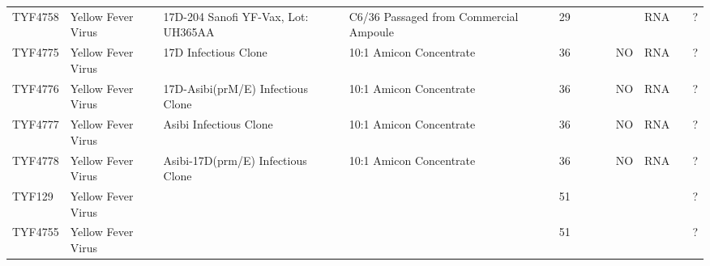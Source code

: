\begin{longtable}{@{}lllllllllllll@{}}
TYF4758        & Yellow Fever Virus & 17D-204 Sanofi YF-Vax, Lot: UH365AA       & C6/36 Passaged from Commercial Ampoule &             & 29                      &                       &           &          &                             & RNA                &                                                                                                  & ?                          \\
TYF4775        & Yellow Fever Virus & 17D Infectious Clone                      & 10:1 Amicon Concentrate                &             & 36                      &                       &           &          & NO                          & RNA                &                                                                                                  & ?                          \\
TYF4776        & Yellow Fever Virus & 17D-Asibi(prM/E) Infectious Clone         & 10:1 Amicon Concentrate                &             & 36                      &                       &           &          & NO                          & RNA                &                                                                                                  & ?                          \\
TYF4777        & Yellow Fever Virus & Asibi Infectious Clone                    & 10:1 Amicon Concentrate                &             & 36                      &                       &           &          & NO                          & RNA                &                                                                                                  & ?                          \\
TYF4778        & Yellow Fever Virus & Asibi-17D(prm/E) Infectious Clone         & 10:1 Amicon Concentrate                &             & 36                      &                       &           &          & NO                          & RNA                &                                                                                                  & ?                          \\
TYF129         & Yellow Fever Virus &                                           &                                        &             & 51                      &                       &           &          &                             &                    &                                                                                                  & ?                          \\
TYF4755        & Yellow Fever Virus &                                           &                                        &             & 51                      &                       &           &          &                             &                    &                                                                                                  & ?                          \\

\end{longtable}
